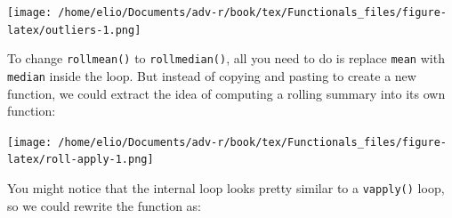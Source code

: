 \texttt{[image: /home/elio/Documents/adv-r/book/tex/Functionals\_files/figure-latex/outliers-1.png]}

To change \texttt{rollmean()} to \texttt{rollmedian()}, all you need to
do is replace \texttt{mean} with \texttt{median} inside the loop. But
instead of copying and pasting to create a new function, we could
extract the idea of computing a rolling summary into its own function:

\begin{Shaded}
\begin{Highlighting}[]
\StringTok{ }
\StringTok{ }\NormalTok{(}\NormalTok{, }

\StringTok{ }\OperatorTok{/}\StringTok{ }\NormalTok{)}
  \OperatorTok{+}\StringTok{ }\NormalTok{)}\OperatorTok{:}\NormalTok{(}\OperatorTok{-}\StringTok{ }\OperatorTok{+}\StringTok{ }\OperatorTok{+}\StringTok{ }\NormalTok{)) \{}
\StringTok{ }\NormalTok{(x[(i }\OperatorTok{-}\StringTok{ }\OperatorTok{:}\OperatorTok{+}\StringTok{ }\OperatorTok{-}\StringTok{ }\NormalTok{)], ...)}
\NormalTok{  \}}
\NormalTok{\}}
\NormalTok{(} \NormalTok{, } \NormalTok{)}
\end{Highlighting}
\end{Shaded}

\texttt{[image: /home/elio/Documents/adv-r/book/tex/Functionals\_files/figure-latex/roll-apply-1.png]}

You might notice that the internal loop looks pretty similar to a
\texttt{vapply()} loop, so we could rewrite the function as:

